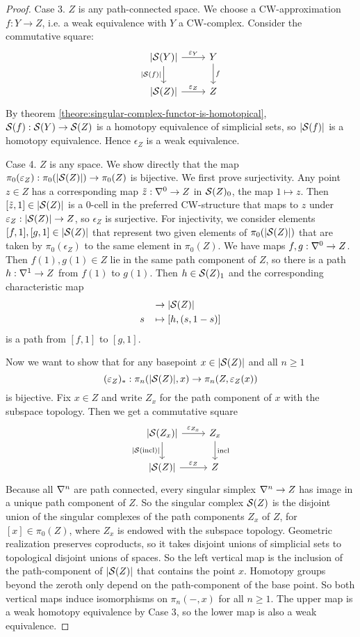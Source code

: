 \begin{proof}
Case 3. $Z$ is any path-connected space. We choose a CW-approximation $f:Y\to Z$, i.e. a weak equivalence with $Y$ a CW-complex. Consider the commutative square:
\[
\begin{tikzcd}
{|\S(Y)|} \ar[d,"{|\S(f)|}"'] \ar[r,"\epsilon_{Y}"] & Y \ar[d,"f"]\\
{|\S(Z)|} \ar[r,"\epsilon_Z"] & Z
\end{tikzcd}
\]
By theorem \ref{theore:singular-complex-functor-is-homotopical}, $\S(f):\S(Y)\to\S(Z)$ is a homotopy equivalence of simplicial sets, so $|\S(f)|$ is a homotopy equivalence. Hence $\epsilon_Z$ is a weak equivalence.

Case 4. $Z$ is any space. We show directly that the map $\pi_0(\epsilon_Z):\pi_0(|\S(Z)|)\to\pi_0(Z)$ is bijective. We first prove surjectivity. Any point $z\in Z$ has a corresponding map $\til z:\sx{0}\to Z$ in $\S(Z)_0$, the map $1\mapsto z$. Then $[\til z,1]\in |\S(Z)|$ is a $0$-cell in the preferred CW-structure that maps to $z$ under $\epsilon_Z:|\S(Z)|\to Z$, so $\epsilon_Z$ is surjective. For injectivity, we consider elements $[f,1],[g,1]\in|\S(Z)|$ that represent two given elements of $\pi_0(|\S(Z)|)$ that are taken by $\pi_0(\epsilon_Z)$ to the same element in $\pi_0(Z)$. We have maps $f,g:\sx{0}\to Z$. Then $f(1),g(1)\in Z$ lie in the same path component of $Z$, so there is a path $h:\sx{1}\to Z$ from $f(1)$ to $g(1)$. Then $h\in\S(Z)_1$ and the corresponding characteristic map
\begin{align*}
[0,1]&\to|\S(Z)|\\
s\ \ \,&\mapsto[h,(s,1-s)]
\end{align*}
is a path from $[f,1]$ to $[g,1]$.

Now we want to show that for any basepoint $x\in|\S(Z)|$ and all $n\ge1$
\[(\epsilon_Z)_*:\pi_n(|\S(Z)|,x)\to\pi_n(Z,\epsilon_Z(x))\]
is bijective. Fix $x\in Z$ and write $Z_x$ for the path component of $x$ with the subspace topology. Then we get a commutative square
\[
\begin{tikzcd}
{|\S(Z_x)|} \ar[d,"{|\S(\incl)|}"'] \ar[r,"\epsilon_{Z_x}"] & Z_x \ar[d,"\incl"]\\
{|\S(Z)|} \ar[r,"\epsilon_Z"] & Z
\end{tikzcd}
\]
Because all $\ns$ are path connected, every singular simplex $\ns\to Z$ has image in a unique path component of $Z$. So the singular complex $\S(Z)$ is the disjoint union of the singular complexes of the path components $Z_x$ of $Z$, for $[x]\in\pi_0(Z)$, where $Z_x$ is endowed with the subspace topology. Geometric realization preserves coproducts, so it takes disjoint unions of simplicial sets to topological disjoint unions of spaces. So the left vertical map is the inclusion of the path-component of $|\S(Z)|$ that contains the point $x$. Homotopy groups beyond the zeroth only depend on the path-component of the base point. So both vertical maps induce isomorphisms on $\pi_n(-,x)$ for all $n\ge1$. The upper map is a weak homotopy equivalence by Case 3, so the lower map is also a weak equivalence.
\end{proof}